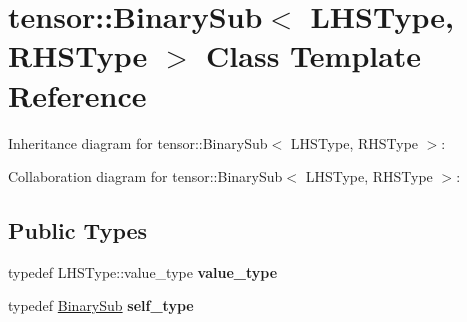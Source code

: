 \hypertarget{classtensor_1_1BinarySub}{}\section{tensor\+:\+:Binary\+Sub$<$ L\+H\+S\+Type, R\+H\+S\+Type $>$ Class Template Reference}
\label{classtensor_1_1BinarySub}


Inheritance diagram for tensor\+:\+:Binary\+Sub$<$ L\+H\+S\+Type, R\+H\+S\+Type $>$\+:


Collaboration diagram for tensor\+:\+:Binary\+Sub$<$ L\+H\+S\+Type, R\+H\+S\+Type $>$\+:
\subsection*{Public Types}
\begin{DoxyCompactItemize}
\item 
typedef L\+H\+S\+Type\+::value\+\_\+type {\bfseries value\+\_\+type}\hypertarget{classtensor_1_1BinarySub_a7f986ade5a2c7f2db06381a134c487ae}{}\label{classtensor_1_1BinarySub_a7f986ade5a2c7f2db06381a134c487ae}

\item 
typedef \hyperlink{classtensor_1_1BinarySub}{Binary\+Sub} {\bfseries self\+\_\+type}\hypertarget{classtensor_1_1BinarySub_a00d15c9c36851e2af2caed9bfb8eca50}{}\label{classtensor_1_1BinarySub_a00d15c9c36851e2af2caed9bfb8eca50}

\end{DoxyCompactItemize}
